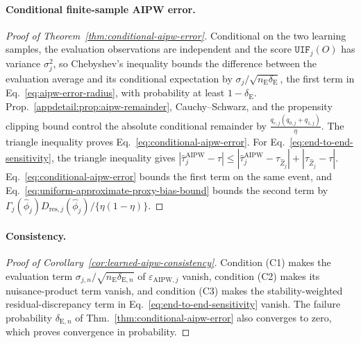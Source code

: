 \paragraph{Conditional finite-sample AIPW error.}
\begin{proof}[Proof of Theorem~\ref{thm:conditional-aipw-error}]
 Conditional on the two learning samples, the evaluation observations are independent and the score $\mathtt{UIF}_j(O)$ has variance $\sigma_j^2$, so Chebyshev's inequality bounds the difference between the evaluation average and its conditional expectation by $\sigma_j/\sqrt{n_{\mathrm E}\delta_{\mathrm E}}$, the first term in Eq.~\eqref{eq:aipw-error-radius}, with probability at least $1-\delta_{\mathrm E}$. Prop.~\ref{appdetail:prop:aipw-remainder}, Cauchy--Schwarz, and the propensity clipping bound control the absolute conditional remainder by
\(\frac{q_{e,j}(q_{0,j}+q_{1,j})}{\eta}.\)
The triangle inequality proves Eq.~\eqref{eq:conditional-aipw-error}.
For Eq.~\eqref{eq:end-to-end-sensitivity}, the triangle inequality gives $|\widehat\tau_j^{\mathrm{AIPW}}-\tau|\le|\widehat\tau_j^{\mathrm{AIPW}}-\tau_{\widehat Z_j}|+|\tau_{\widehat Z_j}-\tau|$. Eq.~\eqref{eq:conditional-aipw-error} bounds the first term on the same event, and Eq.~\eqref{eq:uniform-approximate-proxy-bias-bound} bounds the second term by $\Gamma_j(\widehat\phi_j)D_{\mathrm{res},j}(\widehat\phi_j)/\{\eta(1-\eta)\}$.
\end{proof}

\paragraph{Consistency.}
\begin{proof}[Proof of Corollary~\ref{cor:learned-aipw-consistency}]
 Condition (C1) makes the evaluation term $\sigma_{j,n}/\sqrt{n_{\mathrm E}\delta_{\mathrm E,n}}$ of $\varepsilon_{\mathrm{AIPW},j}$ vanish, condition (C2) makes its nuisance-product term vanish, and condition (C3) makes the stability-weighted residual-discrepancy term in Eq.~\eqref{eq:end-to-end-sensitivity} vanish. The failure probability $\delta_{\mathrm E,n}$ of Thm.~\ref{thm:conditional-aipw-error} also converges to zero, which proves convergence in probability.
\end{proof}


